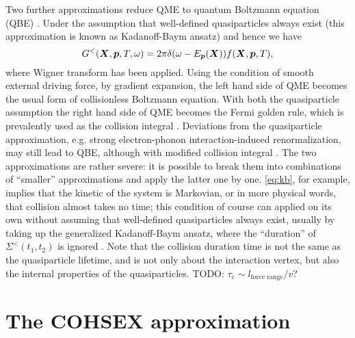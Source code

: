 \documentclass[hyperref, a4paper]{article}
\begin{document}
Two further approximations reduce QME to quantum Boltzmann equation (QBE)
\cite{rammer1986quantum,haug2008quantum}.
Under the assumption that well-defined quasiparticles always exist
(this approximation is known as Kadanoff-Baym ansatz) and hence we have 
\begin{equation}
    G^<(\vb*{X}, \vb*{p}, T, \omega) = 2\pi \delta(\omega - E_{\vb*{p}}(\vb*{X})) f(\vb*{X}, \vb*{p}, T),
    \label{eq:kb}
\end{equation}
where Wigner transform has been applied.
Using the condition of smooth external driving force,
by gradient expansion, the left hand side of QME becomes 
the usual form of collisionless Boltzmann equation.
With both the quasiparticle assumption the right hand side of QME 
becomes the Fermi golden rule, 
which is prevalently used as the collision integral \cite{chen2022first}.
Deviations from the quasiparticle approximation,
e.g. strong electron-phonon interaction-induced renormalization, 
may still lead to QBE,
although with modified collision integral \cite{rammer1986quantum,wais2018quantum}.
The two approximations are rather severe: 
it is possible to break them into combinations of 
``smaller'' approximations
and apply the latter one by one. 
\eqref{eq:kb}, for example, implies that the kinetic of the system 
is Markovian, or in more physical words, 
that collision almost takes no time;
this condition of course can applied on its own 
without assuming that well-defined quasiparticles always exist,
usually by taking up the generalized Kadanoff-Baym ansatz,
where the ``duration'' of $\Sigma^<(t_1, t_2)$ is ignored
\cite{vspivcka2005long3}. 
Note that the collision duration time is not the same as the quasiparticle lifetime,
and is not only about the interaction vertex, 
but also the internal properties of the quasiparticles. TODO: $\tau_{\text{c}} \sim l_{\text{force range}} / v$?

\section{The COHSEX approximation} 

\printbibliography
\end{document}
